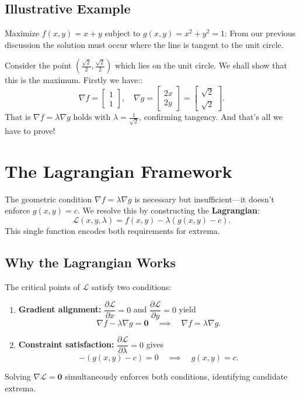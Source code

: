 \documentclass{article}
\begin{document}
\subsection*{Illustrative Example}
Maximize $f(x, y) = x + y$ subject to $g(x, y) = x^2 + y^2 = 1$:
From our previous discussion the solution must occur where the line is tangent to the unit circle.

Consider the point $\left( \frac{\sqrt{2}}{2}, \frac{\sqrt{2}}{2} \right)$ which lies on the unit circle. We shall show that this is the maximum. Firstly we have::
    \[
    \nabla f = \begin{bmatrix} 1 \\ 1 \end{bmatrix}, \quad
    \nabla g = \begin{bmatrix} 2x \\ 2y \end{bmatrix} = \begin{bmatrix} \sqrt{2} \\ \sqrt{2} \end{bmatrix}.
    \]
That is $\nabla f = \lambda \nabla g$ holds with $\lambda = \frac{1}{\sqrt{2}}$, confirming tangency. And that's all we have to prove!

\begin{center}
\end{center}

\section*{The Lagrangian Framework}
The geometric condition $\nabla f = \lambda \nabla g$ is necessary but insufficient—it doesn't enforce $g(x,y)=c$. We resolve this by constructing the \textbf{Lagrangian}:
\[
\mathcal{L}(x, y, \lambda) = f(x, y) - \lambda \left( g(x, y) - c \right).
\]
This single function encodes both requirements for extrema.

\subsection*{Why the Lagrangian Works}
The critical points of $\mathcal{L}$ satisfy two conditions:
\begin{enumerate}
    \item \textbf{Gradient alignment:} $\dfrac{\partial \mathcal{L}}{\partial x} = 0$ and $\dfrac{\partial \mathcal{L}}{\partial y} = 0$ yield
    \[
    \nabla f - \lambda \nabla g = \mathbf{0} \quad \implies \quad \nabla f = \lambda \nabla g.
    \]
    
    \item \textbf{Constraint satisfaction:} $\dfrac{\partial \mathcal{L}}{\partial \lambda} = 0$ gives
    \[
    -(g(x,y) - c) = 0 \quad \implies \quad g(x,y) = c.
    \]
\end{enumerate}
Solving $\nabla \mathcal{L} = \mathbf{0}$ simultaneously enforces both conditions, identifying candidate extrema.
\end{document}
